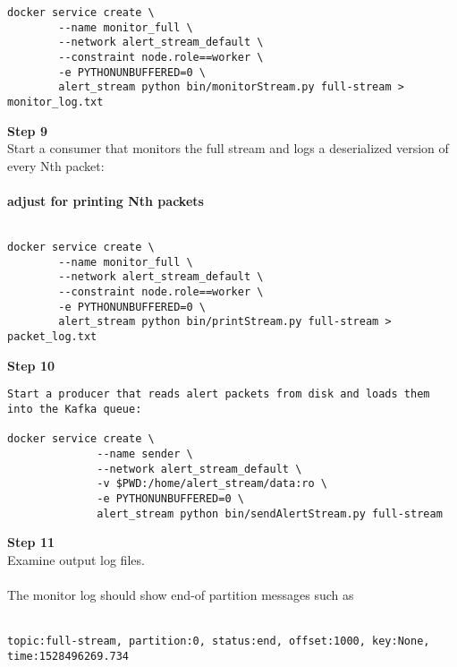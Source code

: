 \begin{verbatim}
docker service create \
        --name monitor_full \
        --network alert_stream_default \
        --constraint node.role==worker \
        -e PYTHONUNBUFFERED=0 \
        alert_stream python bin/monitorStream.py full-stream > monitor_log.txt
\end{verbatim}

\textbf{Step 9}\\
Start a consumer that monitors the full stream and logs a deserialized
version of every Nth packet:\\
~\\
\textbf{adjust for printing Nth packets}\\
~\\

\begin{verbatim}
docker service create \
        --name monitor_full \
        --network alert_stream_default \
        --constraint node.role==worker \
        -e PYTHONUNBUFFERED=0 \
        alert_stream python bin/printStream.py full-stream > packet_log.txt
\end{verbatim}

\textbf{Step 10}\\

\begin{verbatim}
Start a producer that reads alert packets from disk and loads them into the Kafka queue:

docker service create \
              --name sender \
              --network alert_stream_default \
              -v $PWD:/home/alert_stream/data:ro \
              -e PYTHONUNBUFFERED=0 \
              alert_stream python bin/sendAlertStream.py full-stream
\end{verbatim}

\textbf{Step 11}\\
Examine output log files.\\
~\\
The monitor log should show end-of partition messages such as\\
~\\

\begin{verbatim}
topic:full-stream, partition:0, status:end, offset:1000, key:None, time:1528496269.734
\end{verbatim}

